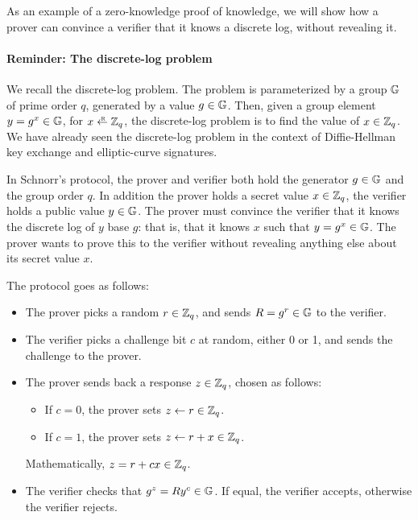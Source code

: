 As an example of a zero-knowledge proof of knowledge, we will show
how a prover can convince a verifier that it knows a discrete
log, without revealing it. 

\paragraph{Reminder: The discrete-log problem}
We recall the discrete-log problem.
The problem is parameterized by 
a group $\mathbb{G}$ of prime order $q$,
generated by a value $g \in \mathbb{G}$.
Then, given a group element $y = g^x \in \mathbb{G}$, for $x \getsr \Z_q$,
the discrete-log problem is to find the value of $x\in \mathbb{Z}_q$.
We have already seen the discrete-log problem in
the context of Diffie-Hellman key exchange and elliptic-curve signatures.

In Schnorr's protocol, the prover and verifier both hold the
generator $g \in \mathbb{G}$ and the group order $q$.
In addition the prover holds a secret value $x \in \mathbb{Z}_q$, the verifier
holds a public value $y \in \mathbb{G}$.
The prover must convince the verifier that it knows the discrete log of $y$
base $g$: that is, that it knows $x$ such that $y=g^x \in \mathbb{G}$.
The prover wants to prove this to the verifier without revealing
anything else about its secret value $x$.

The protocol goes as follows:
\begin{itemize}

\item The prover picks a random $r\in \mathbb{Z}_q$, and sends $R=g^r\in \mathbb{G}$ to the verifier.

\item The verifier picks a challenge bit $c$ at random, either 0 or 1,
      and sends the challenge to the prover.

\item The prover sends back a response $z \in \mathbb{Z}_q$, chosen as follows:  %

  \begin{itemize}
    \item If $c=0$, the prover sets $z \gets r \in \mathbb{Z}_q$.
    \item If $c=1$, the prover sets $z \gets r+x\in \mathbb{Z}_q$.
  \end{itemize}
  Mathematically, $z=r+cx\in \mathbb{Z}_q$.

\item The verifier checks that $g^z=R y^{c}\in \mathbb{G}$.  If equal, the verifier accepts,
  otherwise the verifier rejects.

\end{itemize}

